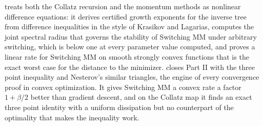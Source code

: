  treats both the Collatz recursion and the momentum methods as nonlinear difference equations: it derives certified growth exponents for the inverse tree from difference inequalities in the style of Krasikov and Lagarias, computes the joint spectral radius that governs the stability of Switching MM under arbitrary switching, which is below one at every parameter value computed, and proves a linear rate for Switching MM on smooth strongly convex functions that is the exact worst case for the distance to the minimizer.  closes Part II with the three point inequality and Nesterov's similar triangles, the engine of every convergence proof in convex optimization. It gives Switching MM a convex rate a factor $1+\beta/2$ better than gradient descent, and on the Collatz map it finds an exact three point identity with a uniform dissipation but no counterpart of the optimality that makes the inequality work.

